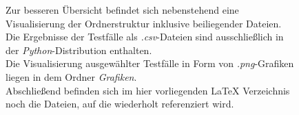 \begin{figure}[h]
	\begin{minipage}[t]{0.45\linewidth}
		\vspace{-\ht\strutbox}
		Zur besseren Übersicht befindet sich nebenstehend eine 
		Visualisierung der Ordnerstruktur inklusive beiliegender 
		Dateien.\\[.1cm] 
		Die Ergebnisse der Testfälle als \textit{.csv}-Dateien sind 
		ausschließlich in der \textit{Python}-Distribution 
		enthalten.\\
		Die Visualisierung ausgewählter Testfälle in Form von 
		\textit{.png}-Grafiken liegen in dem Ordner 
		\textit{Grafiken}.\\[.1cm] 
		Abschließend befinden sich im hier vorliegenden \LaTeX 
		Verzeichnis noch die \jp Dateien, auf die wiederholt 
		referenziert wird.\\
	\end{minipage}
\hfill
	\begin{minipage}[t]{0.45\linewidth}
		
	\end{minipage}
\end{figure}